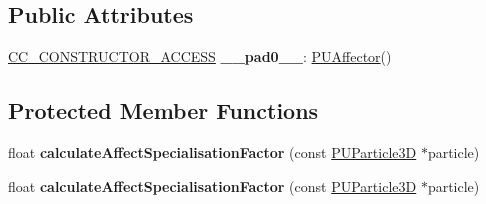 \subsection*{Public Attributes}
\begin{DoxyCompactItemize}
\item 
\mbox{\label{classPUAffector_ad7ca9860fe052f80c277a57c30b2aaba}} 
\hyperlink{_2cocos2d_2cocos_2base_2ccConfig_8h_a25ef1314f97c35a2ed3d029b0ead6da0}{C\+C\+\_\+\+C\+O\+N\+S\+T\+R\+U\+C\+T\+O\+R\+\_\+\+A\+C\+C\+E\+SS} {\bfseries \+\_\+\+\_\+pad0\+\_\+\+\_\+}\+: \hyperlink{classPUAffector}{P\+U\+Affector}()
\end{DoxyCompactItemize}
\subsection*{Protected Member Functions}
\begin{DoxyCompactItemize}
\item 
\mbox{\label{classPUAffector_a985056eba5e7849b7292551d355256d8}} 
float {\bfseries calculate\+Affect\+Specialisation\+Factor} (const \hyperlink{structPUParticle3D}{P\+U\+Particle3D} $\ast$particle)
\item 
\mbox{\label{classPUAffector_a985056eba5e7849b7292551d355256d8}} 
float {\bfseries calculate\+Affect\+Specialisation\+Factor} (const \hyperlink{structPUParticle3D}{P\+U\+Particle3D} $\ast$particle)
\end{DoxyCompactItemize}
